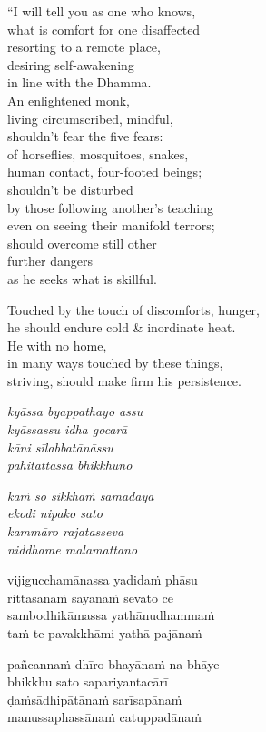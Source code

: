 \documentclass[
  babelLanguage=english,
  final,
  webversion,
]{chantingbook}
\newcommand{\verseref}[1]{\sidepar{#1}}
\begin{document}
%
``I will tell you as one who knows,\\
what is comfort for one disaffected\\
resorting to a remote place,\\
desiring self-awakening\\
in line with the Dhamma.\\
An enlightened monk,\\
\vin living circumscribed, mindful,\\
shouldn't fear the five fears:\\
of horseflies, mosquitoes, snakes,\\
human contact, four-footed beings;\\
shouldn't be disturbed\\
by those following another's teaching\\
even on seeing their manifold terrors;\\
should overcome still other\\
further dangers\\
as he seeks what is skillful.

Touched by the touch of discomforts, hunger,\\
he should endure cold \& inordinate heat.\\
He with no home,\\
in many ways touched by these things,\\
striving, should make firm his persistence.

\clearpage

\paliText

\verseref{7}%
\emph{kyāssa byappathayo assu\\
kyāssassu idha gocarā}\\
\emph{kāni sīlabbatānāssu\\
pahitattassa bhikkhuno}

\verseref{8}%
\emph{kaṁ so sikkhaṁ samādāya\\
ekodi nipako sato}\\
\emph{kammāro rajatasseva\\
niddhame malamattano}

\verseref{9}%
vijigucchamānassa yadidaṁ phāsu\\
rittāsanaṁ sayanaṁ sevato ce\\
sambodhikāmassa yathānudhammaṁ\\
taṁ te pavakkhāmi yathā pajānaṁ

\verseref{10}%
pañcannaṁ dhīro bhayānaṁ na bhāye\\
bhikkhu sato sapariyantacārī\\
ḍaṁsādhipātānaṁ sarīsapānaṁ\\
manussaphassānaṁ catuppadānaṁ
\end{document}
